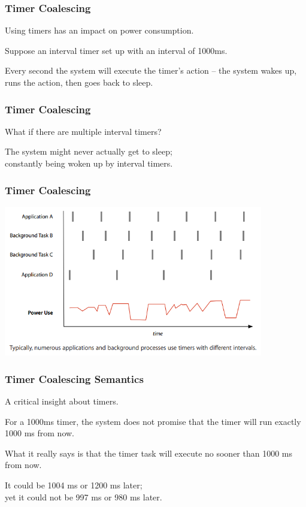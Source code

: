 \begin{frame}
\frametitle{Timer Coalescing}
\begin{changemargin}{1cm}

Using timers has an impact on power consumption. 

Suppose an interval timer set up with an interval of 1000ms. 

Every second the system will execute the timer's action -- the system wakes up, runs the action, then goes back to sleep. 

\end{changemargin}
\end{frame}

\begin{frame}
\frametitle{Timer Coalescing}
\begin{changemargin}{1cm}

What if there are multiple interval timers?

The system might never actually get to sleep; \\
\quad constantly being woken up by interval timers.

\end{changemargin}
\end{frame}

\begin{frame}
\frametitle{Timer Coalescing}
\begin{center}
	\includegraphics[width=0.85\textwidth]{images/coalesced_before.png}
\end{center}

\end{frame}

\begin{frame}
\frametitle{Timer Coalescing Semantics}
\begin{changemargin}{1cm}

A critical insight about timers. 

For a 1000ms timer, the system does not promise that the timer will run exactly 1000 ms from now. 

What it really says is that the timer task will execute \alert{no sooner than} 1000 ms from now. 

It could be 1004 ms or 1200 ms later;\\
\quad yet it could not be 997 ms or 980 ms later.


\end{changemargin}
\end{frame}

